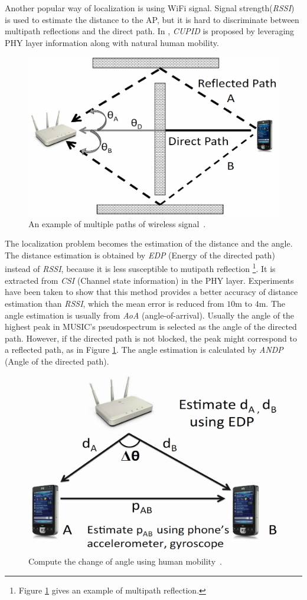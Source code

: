 \documentclass[letterpaper]{article}
\begin{document}
Another popular way of localization is using WiFi signal. 
Signal strength(\emph{RSSI}) is used to estimate the distance to the AP, but it is hard to discriminate between multipath reflections and the direct path.
In \cite{Nirjon:2014:CIL:2594368.2594378}, \emph{CUPID} is proposed by leveraging PHY layer information along with natural human mobility.
\begin{figure}
	\centering
	\includegraphics[width=0.7\linewidth]{fig/multipath.png}
	\caption{An example of multiple paths of wireless signal~\cite{Sen:2013:AMR:2462456.2464463}.}
	\label{fig:multipath}
\end{figure}
The localization problem becomes the estimation of the distance and the angle.
The distance estimation is obtained by \emph{EDP} (Energy of the directed path) instead of \emph{RSSI}, because it is less susceptible to mutipath reflection
\footnote{Figure \ref{fig:multipath} gives an example of multipath reflection.}.
It is extracted from \emph{CSI} (Channel state information) in the PHY layer. 
Experiments have been taken to show that this method provides a better accuracy of distance estimation than \emph{RSSI}, which the mean error is reduced from $ 10 $m to $ 4 $m.
The angle estimation is usually from \emph{AoA} (angle-of-arrival).
Usually the angle of the highest peak in MUSIC's pseudospectrum is selected as the angle of the directed path.
However, if the directed path is not blocked, the peak might correspond to a reflected path, as in Figure \ref{fig:multipath}.
The angle estimation is calculated by \emph{ANDP} (Angle of the directed path).
\begin{figure}
	\centering
	\includegraphics[width=0.7\linewidth]{fig/ANDP.png}
	\caption{Compute the change of angle using human mobility~\cite{Sen:2013:AMR:2462456.2464463}.}
	\label{fig:andp}
\end{figure}
\end{document}
